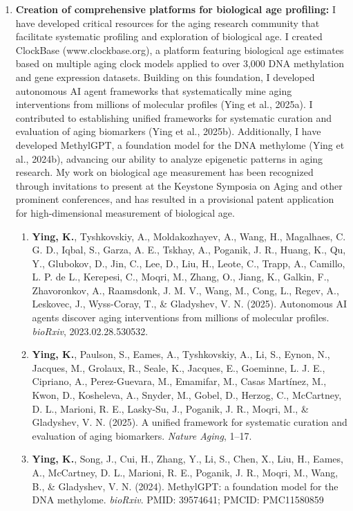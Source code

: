 \documentclass{nihbiosketch}
\begin{document}
\begin{enumerate}
\item \textbf{Creation of comprehensive platforms for biological age profiling:} 
I have developed critical resources for the aging research community that facilitate systematic profiling and exploration of biological age. I created ClockBase (www.clockbase.org), a platform featuring biological age estimates based on multiple aging clock models applied to over 3,000 DNA methylation and gene expression datasets. Building on this foundation, I developed autonomous AI agent frameworks that systematically mine aging interventions from millions of molecular profiles (Ying et al., 2025a). I contributed to establishing unified frameworks for systematic curation and evaluation of aging biomarkers (Ying et al., 2025b). Additionally, I have developed MethylGPT, a foundation model for the DNA methylome (Ying et al., 2024b), advancing our ability to analyze epigenetic patterns in aging research. My work on biological age measurement has been recognized through invitations to present at the Keystone Symposia on Aging and other prominent conferences, and has resulted in a provisional patent application for high-dimensional measurement of biological age.

\begin{enumerate}

\item \textbf{Ying, K.}, Tyshkovskiy, A., Moldakozhayev, A., Wang, H., Magalhaes, C. G. D., Iqbal, S., Garza, A. E., Tskhay, A., Poganik, J. R., Huang, K., Qu, Y., Glubokov, D., Jin, C., Lee, D., Liu, H., Leote, C., Trapp, A., Camillo, L. P. de L., Kerepesi, C., Moqri, M., Zhang, O., Jiang, K., Galkin, F., Zhavoronkov, A., Raamsdonk, J. M. V., Wang, M., Cong, L., Regev, A., Leskovec, J., Wyss-Coray, T., \& Gladyshev, V. N. (2025). Autonomous AI agents discover aging interventions from millions of molecular profiles. \textit{bioRxiv}, 2023.02.28.530532.

\item \textbf{Ying, K.}, Paulson, S., Eames, A., Tyshkovskiy, A., Li, S., Eynon, N., Jacques, M., Grolaux, R., Seale, K., Jacques, E., Goeminne, L. J. E., Cipriano, A., Perez-Guevara, M., Emamifar, M., Casas Martínez, M., Kwon, D., Kosheleva, A., Snyder, M., Gobel, D., Herzog, C., McCartney, D. L., Marioni, R. E., Lasky-Su, J., Poganik, J. R., Moqri, M., \& Gladyshev, V. N. (2025). A unified framework for systematic curation and evaluation of aging biomarkers. \textit{Nature Aging}, 1--17.

\item \textbf{Ying, K.}, Song, J., Cui, H., Zhang, Y., Li, S., Chen, X., Liu, H., Eames, A., McCartney, D. L., Marioni, R. E., Poganik, J. R., Moqri, M., Wang, B., \& Gladyshev, V. N. (2024). MethylGPT: a foundation model for the DNA methylome. \textit{bioRxiv}. PMID: 39574641; PMCID: PMC11580859


\end{enumerate}
\end{enumerate}
\end{document}
